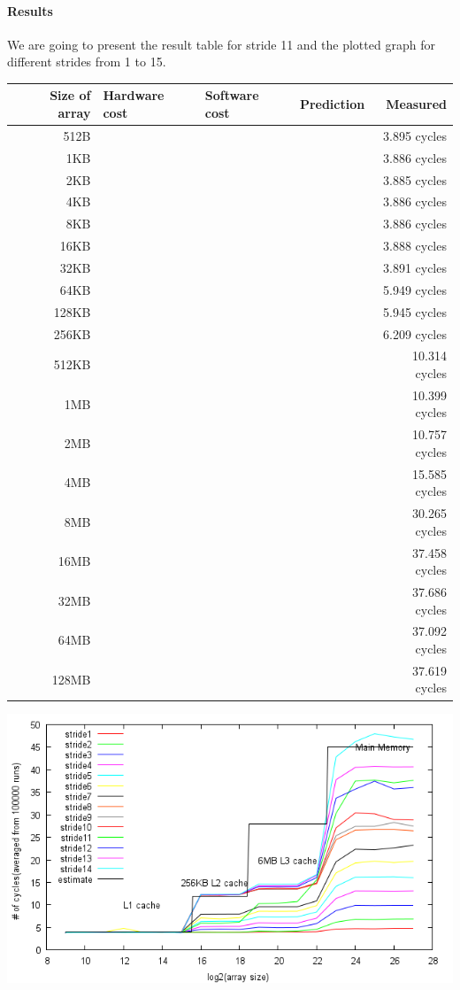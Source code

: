 \paragraph{Results}
We are going to present the result table for stride 11 and the plotted graph for different strides from 1 to 15.
\begin{center}
\begin{tabular}{| r | l | l | l | r |}
\hline
Size of array 	& Hardware cost 	& Software cost 	& Prediction 	& Measured \\ \hline
512B 			&				&				&			&3.895 cycles	\\ \hline
1KB 			&				&				&			&3.886 cycles		\\ \hline
2KB 			&				&				&			&3.885 cycles		\\ \hline
4KB 			&				&				&			&3.886 cycles		\\ \hline
8KB 			&				&				&			&3.886 cycles		\\ \hline
16KB 			&				&				&			&3.888 cycles		\\ \hline
32KB 			&				&				&			&3.891 cycles		\\ \hline
64KB 			&				&				&			&5.949 cycles		\\ \hline
128KB 		&				&				&			&5.945 cycles		\\ \hline
256KB 		&				&				&			&6.209 cycles		\\ \hline
512KB 		&				&				&			&10.314 cycles		\\ \hline
1MB 			&				&				&			&10.399 cycles		\\ \hline
2MB 			&				&				&			&10.757 cycles		\\ \hline
4MB 			&				&				&			&15.585 cycles		\\ \hline
8MB 			&				&				&			&30.265 cycles		\\ \hline
16MB 			&				&				&			&37.458 cycles		\\ \hline
32MB 			&				&				&			&37.686 cycles		\\ \hline
64MB 			&				&				&			&37.092 cycles		\\ \hline
128MB 		&				&				&			&37.619 cycles		\\ \hline

\hline
\end{tabular}
\includegraphics[scale=0.8]{memoryLatencyImage}
\end{center}


